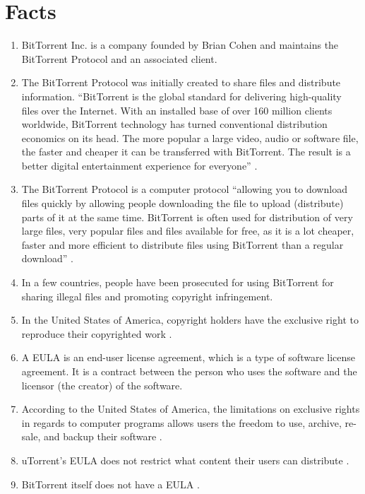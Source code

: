 \documentclass[11pt]{article}
\begin{document}
\section{Facts}
\begin{enumerate}
\item BitTorrent Inc. is a company founded by Brian Cohen and maintains the BitTorrent Protocol and an associated client. \cite{btabout}
\item The BitTorrent Protocol was initially created to share files and distribute information. ``BitTorrent is the global standard for delivering high-quality files over the Internet. With an installed base of over 160 million clients worldwide, BitTorrent technology has turned conventional distribution economics on its head. The more popular a large video, audio or software file, the faster and cheaper it can be transferred with BitTorrent. The result is a better digital entertainment experience for everyone'' \cite{btabout}.
\item The BitTorrent Protocol is a computer protocol ``allowing you to download files quickly by allowing people downloading the file to upload (distribute) parts of it at the same time. BitTorrent is often used for distribution of very large files, very popular files and files available for free, as it is a lot cheaper, faster and more efficient to distribute files using BitTorrent than a regular download'' \cite{btabout}.
\item In a few countries, people have been prosecuted for using BitTorrent for sharing illegal files and promoting copyright infringement. \cite{tpbverdict}
\item In the United States of America, copyright holders have the exclusive right to reproduce their copyrighted work \cite{t17c1s106}.
\item A EULA is an end-user license agreement, which is a type of software license agreement. It is a contract between the person who uses the software and the licensor (the creator) of the software.
\item According to the United States of America, the limitations on exclusive rights in regards to computer programs allows users the freedom to use, archive, re-sale, and backup their software \cite{t17s117}.
\item uTorrent's EULA does not restrict what content their users can distribute \cite{utorrentEula}.
\item BitTorrent itself does not have a EULA \cite{utorrentEula}.
\end{enumerate}
\end{document}
